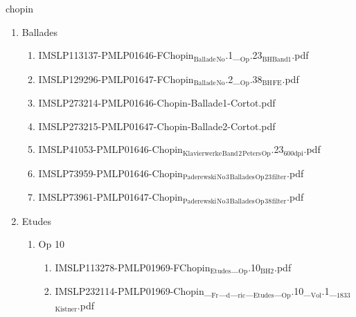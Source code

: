 \documentclass[11pt]{article}
\begin{document}
\item chopin
\label{sec-1-1-1-1-44-21}
\begin{enumerate}
\item Ballades
\label{sec-1-1-1-1-44-21-1}
\begin{enumerate}
\item IMSLP113137-PMLP01646-FChopin$_{\text{Ballade}}$$_{\text{No}}$.1\_$_{\text{Op}}$.23$_{\text{BHBand1}}$.pdf
\label{sec-1-1-1-1-44-21-1-1}

\item IMSLP129296-PMLP01647-FChopin$_{\text{Ballade}}$$_{\text{No}}$.2\_$_{\text{Op}}$.38$_{\text{BH}}$$_{\text{FE}}$.pdf
\label{sec-1-1-1-1-44-21-1-2}

\item IMSLP273214-PMLP01646-Chopin-Ballade1-Cortot.pdf
\label{sec-1-1-1-1-44-21-1-3}

\item IMSLP273215-PMLP01647-Chopin-Ballade2-Cortot.pdf
\label{sec-1-1-1-1-44-21-1-4}

\item IMSLP41053-PMLP01646-Chopin$_{\text{Klavierwerke}}$$_{\text{Band}}$$_{\text{2}}$$_{\text{Peters}}$$_{\text{Op}}$.23$_{\text{600dpi}}$.pdf
\label{sec-1-1-1-1-44-21-1-5}

\item IMSLP73959-PMLP01646-Chopin$_{\text{Paderewski}}$$_{\text{No}}$$_{\text{3}}$$_{\text{Ballades}}$$_{\text{Op}}$$_{\text{23}}$$_{\text{filter}}$.pdf
\label{sec-1-1-1-1-44-21-1-6}

\item IMSLP73961-PMLP01647-Chopin$_{\text{Paderewski}}$$_{\text{No}}$$_{\text{3}}$$_{\text{Ballades}}$$_{\text{Op}}$$_{\text{38}}$$_{\text{filter}}$.pdf
\label{sec-1-1-1-1-44-21-1-7}
\end{enumerate}

\item Etudes
\label{sec-1-1-1-1-44-21-2}
\begin{enumerate}
\item Op 10
\label{sec-1-1-1-1-44-21-2-1}
\begin{enumerate}
\item IMSLP113278-PMLP01969-FChopin$_{\text{Etudes}}$\_$_{\text{Op}}$.10$_{\text{BH2}}$.pdf
\label{sec-1-1-1-1-44-21-2-1-1}

\item IMSLP232114-PMLP01969-Chopin\_$_{\text{Fr}}$\_$_{\text{d}}$\_$_{\text{ric}}$\_$_{\text{Etudes}}$\_$_{\text{Op}}$.10\_$_{\text{Vol}}$.1\_$_{\text{1833}}$$_{\text{Kistner}}$.pdf
\label{sec-1-1-1-1-44-21-2-1-2}
\end{enumerate}


\end{enumerate}
\end{enumerate}
\end{document}
